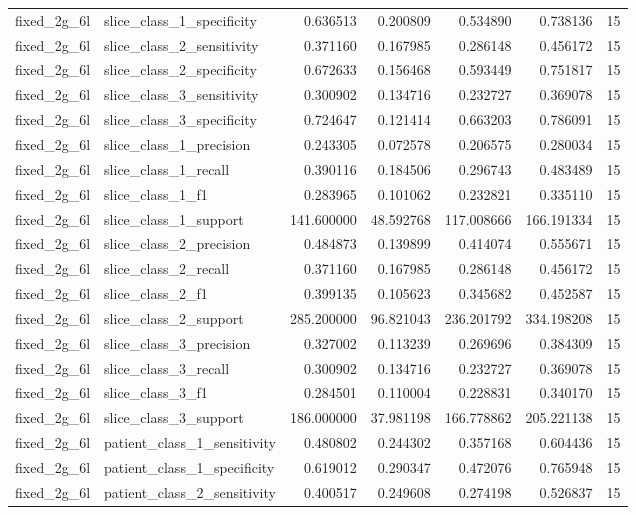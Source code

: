 \begin{tabular}{llrrrrr}
fixed_2g_6l & slice_class_1_specificity & 0.636513 & 0.200809 & 0.534890 & 0.738136 & 15 \\
fixed_2g_6l & slice_class_2_sensitivity & 0.371160 & 0.167985 & 0.286148 & 0.456172 & 15 \\
fixed_2g_6l & slice_class_2_specificity & 0.672633 & 0.156468 & 0.593449 & 0.751817 & 15 \\
fixed_2g_6l & slice_class_3_sensitivity & 0.300902 & 0.134716 & 0.232727 & 0.369078 & 15 \\
fixed_2g_6l & slice_class_3_specificity & 0.724647 & 0.121414 & 0.663203 & 0.786091 & 15 \\
fixed_2g_6l & slice_class_1_precision & 0.243305 & 0.072578 & 0.206575 & 0.280034 & 15 \\
fixed_2g_6l & slice_class_1_recall & 0.390116 & 0.184506 & 0.296743 & 0.483489 & 15 \\
fixed_2g_6l & slice_class_1_f1 & 0.283965 & 0.101062 & 0.232821 & 0.335110 & 15 \\
fixed_2g_6l & slice_class_1_support & 141.600000 & 48.592768 & 117.008666 & 166.191334 & 15 \\
fixed_2g_6l & slice_class_2_precision & 0.484873 & 0.139899 & 0.414074 & 0.555671 & 15 \\
fixed_2g_6l & slice_class_2_recall & 0.371160 & 0.167985 & 0.286148 & 0.456172 & 15 \\
fixed_2g_6l & slice_class_2_f1 & 0.399135 & 0.105623 & 0.345682 & 0.452587 & 15 \\
fixed_2g_6l & slice_class_2_support & 285.200000 & 96.821043 & 236.201792 & 334.198208 & 15 \\
fixed_2g_6l & slice_class_3_precision & 0.327002 & 0.113239 & 0.269696 & 0.384309 & 15 \\
fixed_2g_6l & slice_class_3_recall & 0.300902 & 0.134716 & 0.232727 & 0.369078 & 15 \\
fixed_2g_6l & slice_class_3_f1 & 0.284501 & 0.110004 & 0.228831 & 0.340170 & 15 \\
fixed_2g_6l & slice_class_3_support & 186.000000 & 37.981198 & 166.778862 & 205.221138 & 15 \\
fixed_2g_6l & patient_class_1_sensitivity & 0.480802 & 0.244302 & 0.357168 & 0.604436 & 15 \\
fixed_2g_6l & patient_class_1_specificity & 0.619012 & 0.290347 & 0.472076 & 0.765948 & 15 \\
fixed_2g_6l & patient_class_2_sensitivity & 0.400517 & 0.249608 & 0.274198 & 0.526837 & 15 \\

\end{tabular}
